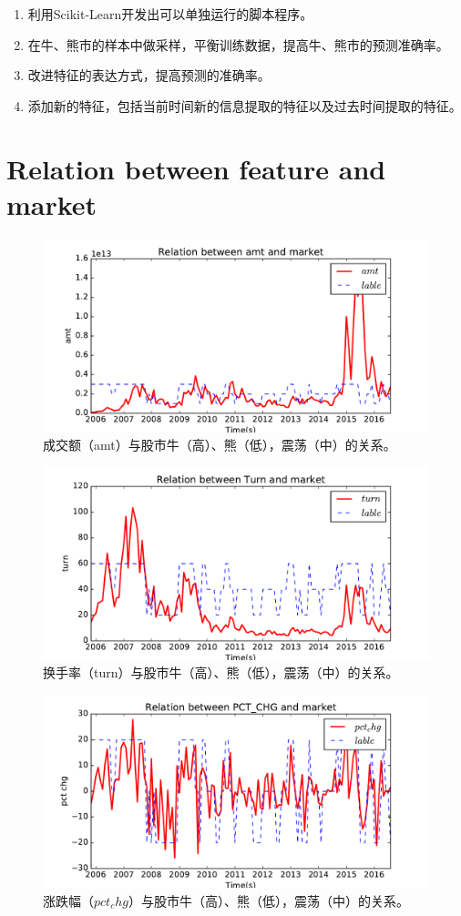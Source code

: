 \documentclass[10pt,a4paper]{article}
\begin{document}
\begin{enumerate}
	\item 利用Scikit-Learn开发出可以单独运行的脚本程序。
	\item 在牛、熊市的样本中做采样，平衡训练数据，提高牛、熊市的预测准确率。
	\item 改进特征的表达方式，提高预测的准确率。
	\item 添加新的特征，包括当前时间新的信息提取的特征以及过去时间提取的特征。
\end{enumerate}
		
\section{Relation between feature and market}


\begin{figure}[t]
	\centering
	\includegraphics[width=0.9\linewidth]{amt.pdf}
	\caption{成交额（amt）与股市牛（高）、熊（低），震荡（中）的关系。}
	\label{fig1}
\end{figure}
\begin{figure}[t]
	\centering
	\includegraphics[width=0.9\linewidth]{turn.pdf}
	\caption{换手率（turn）与股市牛（高）、熊（低），震荡（中）的关系。}
	\label{fig2}
\end{figure}
\begin{figure}[t]
	\centering
	\includegraphics[width=0.9\linewidth]{PCT.pdf}
	\caption{涨跌幅（$pct_chg$）与股市牛（高）、熊（低），震荡（中）的关系。}
	\label{fig3}
\end{figure}
\end{document}

